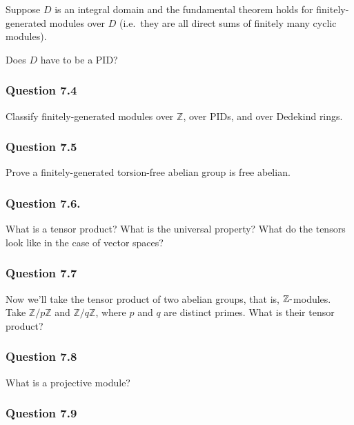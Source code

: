 Suppose \(D\) is an integral domain and the fundamental theorem holds
for finitely-generated modules over \(D\) (i.e.~they are all direct sums
of finitely many cyclic modules).

Does \(D\) have to be a PID?

\hypertarget{question-7.4}{%
\subsubsection{Question 7.4}\label{question-7.4}}

Classify finitely-generated modules over \({\mathbb{Z}}\), over PIDs,
and over Dedekind rings.

\hypertarget{question-7.5}{%
\subsubsection{Question 7.5}\label{question-7.5}}

Prove a finitely-generated torsion-free abelian group is free abelian.

\hypertarget{question-7.6.}{%
\subsubsection{Question 7.6.}\label{question-7.6.}}

What is a tensor product? What is the universal property? What do the
tensors look like in the case of vector spaces?

\hypertarget{question-7.7}{%
\subsubsection{Question 7.7}\label{question-7.7}}

Now we'll take the tensor product of two abelian groups, that is,
\({\mathbb{Z}}{\hbox{-}}\)modules. Take \({\mathbb{Z}}/p{\mathbb{Z}}\)
and \({\mathbb{Z}}/q{\mathbb{Z}}\), where \(p\) and \(q\) are distinct
primes. What is their tensor product?

\hypertarget{question-7.8}{%
\subsubsection{Question 7.8}\label{question-7.8}}

What is a projective module?

\hypertarget{question-7.9}{%
\subsubsection{Question 7.9}\label{question-7.9}}

